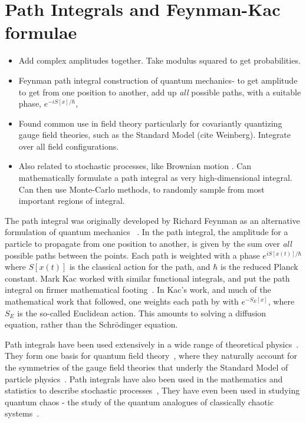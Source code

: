 \chapter{Path Integrals and Feynman-Kac formulae}

\begin{itemize}
\item Add complex amplitudes together.  Take modulus squared to get probabilities.  
\item Feynman path integral construction of quantum mechanics- 
to get amplitude to get from one position to another, add up \emph{all} possible paths,
 with a suitable phase, $e^{-i S[x]/\hbar}$, \cite{Feynman1942, Feynman1965}
\item Found common use in field theory particularly for covariantly quantizing gauge field theories,
 such as the Standard Model (cite Weinberg).  Integrate over all field configurations.  
\item  Also related to stochastic processes, like Brownian motion \cite{Karatzas1991}.
   Can mathematically formulate a path integral as very high-dimensional integral.
  Can then use Monte-Carlo methods, to randomly sample from most important regions of integral.  
\end{itemize}



    The path integral was originally developed by Richard Feynman as an alternative formulation of quantum mechanics
    ~\cite{Feynman1948,Feynman1965}.  
    In the path integral, the amplitude for a particle to propagate from one position to another,
    is given by the sum over \emph{all} possible paths between the points.  
    Each path is weighted with a phase $e^{iS[x(t)]/\hbar}$ where $S[x(t)]$ is the classical action for the path,
    and $\hbar$ is the reduced Planck constant.   
    Mark Kac worked with similar functional integrals, and put the path integral 
    on firmer mathematical footing~\cite{Kac1949}.  In Kac's work, and much of the mathematical
    work that followed, one weights each path
    by with $e^{-S_E[x]}$, where $S_E$ is the so-called Euclidean action.  
    This amounts to solving a diffusion equation, rather than the Schr\"odinger equation.  

    Path integrals have been used extensively in a wide range of theoretical physics~\cite{Kleinert2012}.
    They form one basis for quantum field theory~\cite{Brown1994}, where they naturally
    account for the symmetries of the gauge field theories that underly the Standard Model of 
    particle physics~\cite{Srednicki2008}.  Path integrals have also been used in the 
    mathematics and statistics to describe stochastic processes~\cite{Durrett1996, Karatzas1991},
    They have even been used in studying quantum chaos - the study of the quantum analogues 
    of classically chaotic systems~\cite{Gutzwiller1990}.

